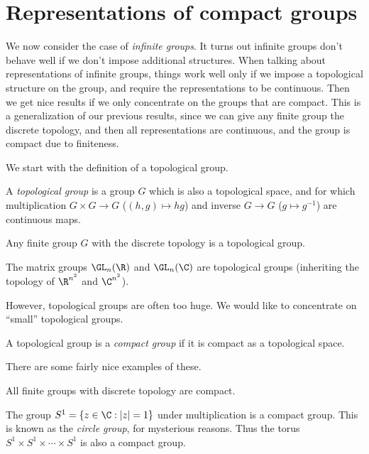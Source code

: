 \documentclass[a4paper]{article}
\begin{document}
\section{Representations of compact groups}
We now consider the case of \emph{infinite groups}. It turns out infinite groups don't behave well if we don't impose additional structures. When talking about representations of infinite groups, things work well only if we impose a topological structure on the group, and require the representations to be continuous. Then we get nice results if we only concentrate on the groups that are compact. This is a generalization of our previous results, since we can give any finite group the discrete topology, and then all representations are continuous, and the group is compact due to finiteness.

We start with the definition of a topological group.
\begin{defi}
  A \emph{topological group} is a group $G$ which is also a topological space, and for which multiplication $G \times G \to G$ ($(h, g) \mapsto hg$) and inverse $G \to G$ ($g \mapsto g^{-1}$) are continuous maps.
\end{defi}

\begin{eg}
  Any finite group $G$ with the discrete topology is a topological group.
\end{eg}

\begin{eg}
  The matrix groups $\GL_n(\R)$ and $\GL_n(\C)$ are topological groups (inheriting the topology of $\R^{n^2}$ and $\C^{n^2}$).
\end{eg}

However, topological groups are often too huge. We would like to concentrate on ``small'' topological groups.
\begin{defi}
  A topological group is a \emph{compact group} if it is compact as a topological space.
\end{defi}
There are some fairly nice examples of these.
\begin{eg}
  All finite groups with discrete topology are compact.
\end{eg}

\begin{eg}
  The group $S^1 = \{z \in \C: |z| = 1\}$ under multiplication is a compact group. This is known as the \emph{circle group}, for mysterious reasons. Thus the torus $S^1 \times S^1 \times \cdots \times S^1$ is also a compact group.
\end{eg}
\end{document}
